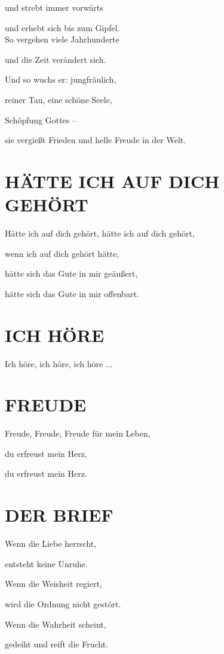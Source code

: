 \documentclass[11pt,a5paper,twoside]{article}
\begin{document}
und strebt immer vorwärts

und erhebt sich bis zum Gipfel.\\

So vergehen viele Jahrhunderte

und die Zeit verändert sich.

Und so wuchs er: jungfräulich,

reiner Tau, eine schöne Seele,

Schöpfung Gottes --

sie vergießt Frieden und helle Freude in der Welt.


\section[Hätte ich auf dich gehört]{HÄTTE ICH AUF DICH GEHÖRT}

Hätte ich auf dich gehört, hätte ich auf dich gehört,

wenn ich auf dich gehört hätte,

hätte sich das Gute in mir geäußert, 

hätte sich das Gute in mir offenbart.

\section[Ich höre]{ICH HÖRE}

Ich höre, ich höre, ich höre ...

\section[Freude]{FREUDE}

Freude, Freude, Freude für mein Leben, 

du erfreust mein Herz, 

du erfreust mein Herz. 

\section[Der Brief]{DER BRIEF}

Wenn die Liebe herrscht, 

entsteht keine Unruhe. 

Wenn die Weisheit regiert, 

wird die Ordnung nicht gestört.

Wenn die Wahrheit scheint, 
 
gedeiht und reift die Frucht. 
\end{document}
